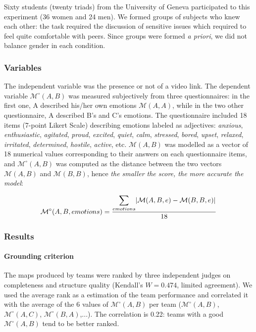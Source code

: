 \documentclass[natbib]{svjour3}
\newcommand{\A}{A\xspace}
\newcommand{\B}{B\xspace}
\newcommand{\C}{C\xspace}
\newcommand{\M}[3]{{\mathcal{M}(#1, #2, #3)}}
\newcommand{\gmodel}[2]{{$\mathcal{M}(#1, #2)$}}
\newcommand{\gModel}[2]{{$\mathcal{M}^{\circ}(#1, #2)$}}
\newcommand{\Mdeg}[3]{{\mathcal{M}^{\circ}(#1, #2, #3)}}
\DeclarePairedDelimiter\abs{\lvert}{\rvert}%
\begin{document}
Sixty students (twenty triads) from the University of Geneva participated to
this experiment (36 women and 24 men). We formed groups of subjects who knew
each other: the task required the discussion of sensitive issues which required
to feel quite comfortable with peers. Since groups were formed \textit{a
priori}, we did not balance gender in each condition.

\subsubsection*{Variables}

The independent variable was the presence or not of a video link. The dependent
variable \gModel{A}{B} was measured subjectively from three questionnaires: in
the first one, \A described his/her own emotions \gmodel{A}{A}, while in the
two other questionnaire, \A described \B's and \C's emotions. The questionnaire
included 18 items (7-point Likert Scale) describing emotions labeled as
adjectives: \emph{anxious}, \emph{enthusiastic}, \emph{agitated}, \emph{proud},
\emph{excited}, \emph{quiet}, \emph{calm}, \emph{stressed}, \emph{bored},
\emph{upset}, \emph{relaxed}, \emph{irritated}, \emph{determined},
\emph{hostile}, \emph{active}, etc. \gmodel{A}{B} was modelled as a vector of 18
numerical values corresponding to their answers on each questionnaire items, and
\gModel{A}{B} was computed as the distance between the two vectors
\gmodel{A}{B} and \gmodel{B}{B}, hence \emph{the smaller the score, the more
accurate the model}:

\[
    \Mdeg{A}{B}{emotions} = \frac{\displaystyle\sum_{emotions} \abs{\M{A}{B}{e} -
    \M{B}{B}{e}}}{18}
\]


\subsubsection*{Results}

\paragraph{Grounding criterion} The maps produced by teams were ranked by three
independent judges on completeness and structure quality (Kendall's $W=0.474$,
limited agreement). We used the average rank as a estimation of the team
performance and correlated it with the average of the 6 values of \gModel{A}{B}
per team (\gModel{A}{B}, \gModel{A}{C}, \gModel{B}{A},...). The correlation is
0.22: teams with a good \gModel{A}{B} tend to be better ranked. 
\end{document}
